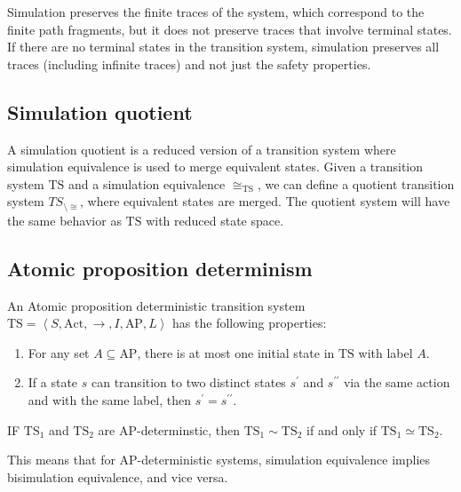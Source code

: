 Simulation preserves the finite traces of the system, which correspond to the finite path fragments, but it does not preserve traces that involve terminal states.
If there are no terminal states in the transition system, simulation preserves all traces (including infinite traces) and not just the safety properties.

\subsection{Simulation quotient}
A simulation quotient is a reduced version of a transition system where simulation equivalence is used to merge equivalent states.
Given a transition system $\text{TS}$ and a simulation equivalence $\cong_{\text{TS}}$, we can define a quotient transition system $TS_{\setminus\cong}$, where equivalent states are merged.
The quotient system will have the same behavior as $\text{TS}$ with reduced state space.

\subsection{Atomic proposition determinism}
\begin{definition}
    An Atomic proposition deterministic transition system $\text{TS}=\left\langle S,\text{Act},\rightarrow,I,\text{AP},L\right\rangle$ has the following properties: 
    \begin{enumerate}
        \item For any set $A\subseteq\text{AP}$, there is at most one initial state in $\text{TS}$ with label $A$.
        \item If a state $s$ can transition to two distinct states $s^\prime$ and $s^{\prime\prime}$ via the same action and with the same label, then $s^\prime=s^{\prime\prime}$.
    \end{enumerate}
\end{definition}
\begin{theorem}
    IF $\text{TS}_1$ and $\text{TS}_2$ are AP-determinstic, then $\text{TS}_1\sim\text{TS}_2$ if and only if $\text{TS}_1\simeq\text{TS}_2$. 
\end{theorem}
\noindent This means that for AP-deterministic systems, simulation equivalence implies bisimulation equivalence, and vice versa.

